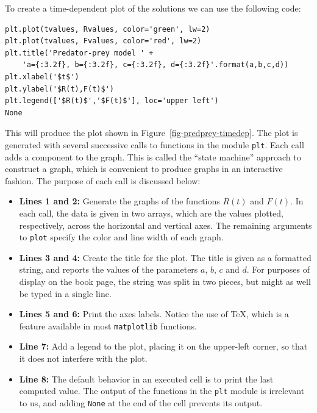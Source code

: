 To create a time-dependent plot of the solutions we can use the following code:
\begin{lstlisting}
plt.plot(tvalues, Rvalues, color='green', lw=2)
plt.plot(tvalues, Fvalues, color='red', lw=2)
plt.title('Predator-prey model ' + 
    'a={:3.2f}, b={:3.2f}, c={:3.2f}, d={:3.2f}'.format(a,b,c,d))
plt.xlabel('$t$')
plt.ylabel('$R(t),F(t)$')
plt.legend(['$R(t)$','$F(t)$'], loc='upper left')
None
\end{lstlisting}
This will produce the plot shown in Figure~\ref{fig-predprey-timedep}.
The plot is generated with several successive calls to functions in the module \texttt{plt}. Each call adds a component to the graph. This is called the ``state machine'' approach to construct a graph, which is convenient to produce graphs in an interactive fashion. The purpose of each call is discussed below:
\begin{itemize}
\item \textbf{Lines 1 and 2:} Generate the graphs of the functions $R(t)$ and $F(t)$. In each call, the data is given in two arrays, which are the values plotted, respectively, across the horizontal and vertical axes. The remaining arguments to \texttt{plot} specify the color and line width of each graph.
\item \textbf{Lines 3 and 4:} Create the title for the plot. The title is given as a formatted string, and reports the values of the parameters $a$, $b$, $c$ and $d$. For purposes of display on the book page, the string was split in two pieces, but might as well be typed in a single line.
\item \textbf{Lines 5 and 6:} Print the axes labels. Notice the use of \TeX{}, which is a feature available in most \texttt{matplotlib} functions.
\item \textbf{Line 7:} Add a legend to the plot, placing it on the upper-left corner, so that it does not interfere with the plot.
\item \textbf{Line 8:} The default behavior in an executed cell is to print the last computed value. The output of the functions in the \texttt{plt} module is irrelevant to us, and adding \texttt{None} at the end of the cell prevents its output.
\end{itemize}

